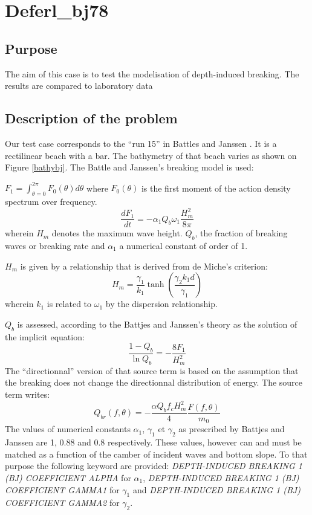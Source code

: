\chapter{Deferl\_bj78}
%
\section{Purpose}
%
The aim of this case is to test the modelisation of depth-induced breaking. The
results are compared to laboratory data \cite{Battjes1978}
%
\section{Description of the problem}
%
Our test case corresponds to the ``run 15'' in Battles and Janssen
\cite{Battjes1978}. It is a rectilinear beach with a bar. The bathymetry of that
beach varies as shown on Figure \ref{bathybj}. The Battle and Janssen's
breaking model is used:

$ F_1=\int_{\theta=0}^{2\pi}F_0(\theta) d\theta$ where $F_0(\theta)$ is the
first moment of the action density spectrum over frequency.
$$
\frac{dF_1}{dt}=-\alpha_1Q_b\omega_1\frac{H_m^2}{8\pi}
$$
wherein $H_m$ denotes the maximum wave height. $Q_b$, the fraction of breaking
waves or breaking rate and $\alpha_1$ a numerical constant of order of 1.

$H_m$ is given by a relationship that is derived from de Miche's criterion:
$$
H_m=\frac{\gamma_1}{k_1}\tanh\left(\frac{\gamma_2k_1d}{\gamma_1} \right)
$$
wherein $k_1$ is related to $\omega_1$ by the dispersion relationship.

$Q_b$ is assessed, according to the Battjes and Janssen's theory as the
solution of the implicit equation:
$$
\frac{1-Q_b}{\ln Q_b}=-\frac{8F_1}{H_m^2}
$$
The ``directionnal'' version of that source term is based on the assumption
that the breaking does not change the directionnal distribution of energy. The
source term writes:
$$
Q_{br}(f,\theta)=- \frac{\alpha Q_bf_cH^2_m}{4}\frac{F(f,\theta)}{m_0}
$$
The values of numerical constants $\alpha_1$, $\gamma_1$ et $\gamma_2$ as
prescribed by Battjes and Janssen are 1, 0.88 and 0.8 respectively. These
values, however can and must be matched as a function of the camber of incident
waves and bottom slope. To that purpose the following keyword are provided:
{\it DEPTH-INDUCED BREAKING 1 (BJ) COEFFICIENT ALPHA} for $\alpha_1$, {\it
DEPTH-INDUCED BREAKING 1 (BJ) COEFFICIENT GAMMA1} for $\gamma_1$ and {\it
DEPTH-INDUCED BREAKING 1 (BJ) COEFFICIENT GAMMA2} for $\gamma_2$.

